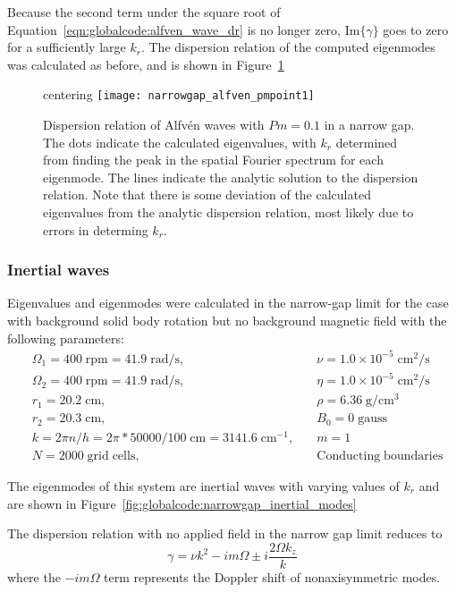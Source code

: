 \documentclass[letterpaper]{article}
\begin{document}
Because the second term under the square root of
Equation~\ref{eqn:globalcode:alfven_wave_dr} is no longer zero, $\mathrm{Im}\{\gamma\}$ goes to zero for a sufficiently large $k_r$. The dispersion relation of the computed eigenmodes was calculated as before, and is shown in Figure~\ref{fig:globalcode:narrowgap_alfven_pmpoint1}

\begin{figure}
centering
\texttt{[image: narrowgap\_alfven\_pmpoint1]}
\caption[Dispersion relation of Alfv\'en waves with $Pm=0.1$ in a
  narrow gap]{Dispersion relation of Alfv\'en waves with $Pm=0.1$ in a
  narrow gap. The dots indicate the calculated eigenvalues, with $k_r$
  determined from finding the peak in the spatial Fourier spectrum for
  each eigenmode. The lines indicate the analytic solution to the
  dispersion relation. Note that there is some deviation of the
  calculated eigenvalues from the analytic dispersion relation, most
  likely due to errors in determing $k_r$.}
\label{fig:globalcode:narrowgap_alfven_pmpoint1}
\end{figure}


\subsubsection{Inertial waves}

Eigenvalues and eigenmodes were calculated in the narrow-gap limit for
the case with background solid body rotation but no background
magnetic field with the following parameters:
\begin{align*}
&\Omega_1 = 400\;\mathrm{rpm} = 41.9\;\mathrm{rad/s},\quad
    &\nu = 1.0\times10^{-5}\;\mathrm{cm^2/s}
\\
&\Omega_2 = 400\;\mathrm{rpm} = 41.9\;\mathrm{rad/s},\quad
    &\eta = 1.0\times10^{-5}\;\mathrm{cm^2/s}
\\
&r_1 = 20.2\;\mathrm{cm},\quad &\rho = 6.36\;\mathrm{g/cm^3}
\\
&r_2 = 20.3\;\mathrm{cm},\quad &B_0 = 0\; \mathrm{gauss}
\\
&k = 2\pi n/h = 2\pi*50000/100\;\mathrm{cm} = 3141.6\;\mathrm{cm^{-1}},\quad
    &m=1
\\
&N = 2000\;\mathrm{grid\;cells},\quad &\mathrm{Conducting\;boundaries}
\end{align*}

The eigenmodes of this system are inertial waves with varying values
of $k_r$ and are shown in
Figure~\ref{fig:globalcode:narrowgap_inertial_modes}

The dispersion relation with no applied field in the narrow gap limit
reduces to
\begin{equation}
\gamma = \nu k^2 - im\Omega \pm i \frac{2 \Omega k_z}{k}
\end{equation}
where the $-im\Omega$ term represents the Doppler shift of
nonaxisymmetric modes.
\end{document}
